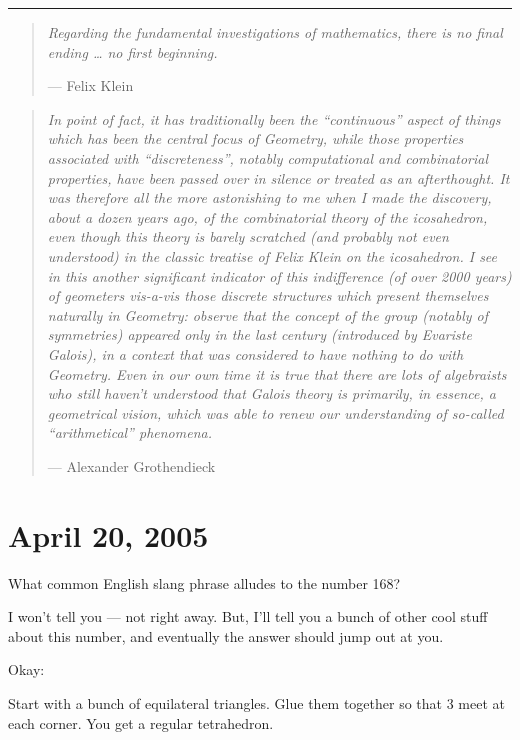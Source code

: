 \documentclass{article}
\begin{document}
\begin{center}\rule{0.5\linewidth}{0.5pt}\end{center}

\begin{quote}
\emph{Regarding the fundamental investigations of mathematics, there is
no final ending \ldots{} no first beginning.}

--- Felix Klein
\end{quote}

\begin{quote}
\emph{In point of fact, it has traditionally been the ``continuous''
aspect of things which has been the central focus of Geometry, while
those properties associated with ``discreteness'', notably computational
and combinatorial properties, have been passed over in silence or
treated as an afterthought. It was therefore all the more astonishing to
me when I made the discovery, about a dozen years ago, of the
combinatorial theory of the icosahedron, even though this theory is
barely scratched (and probably not even understood) in the classic
treatise of Felix Klein on the icosahedron. I see in this another
significant indicator of this indifference (of over 2000 years) of
geometers vis-a-vis those discrete structures which present themselves
naturally in Geometry: observe that the concept of the group (notably of
symmetries) appeared only in the last century (introduced by Evariste
Galois), in a context that was considered to have nothing to do with
Geometry. Even in our own time it is true that there are lots of
algebraists who still haven't understood that Galois theory is
primarily, in essence, a geometrical vision, which was able to renew our
understanding of so-called ``arithmetical'' phenomena.}

--- Alexander Grothendieck
\end{quote}



\hypertarget{week214}{%
\section{April 20, 2005}\label{week214}}

What common English slang phrase alludes to the number 168?

I won't tell you --- not right away. But, I'll tell you a bunch of other
cool stuff about this number, and eventually the answer should jump out
at you.

Okay:

Start with a bunch of equilateral triangles. Glue them together so that
3 meet at each corner. You get a regular tetrahedron.
\end{document}
